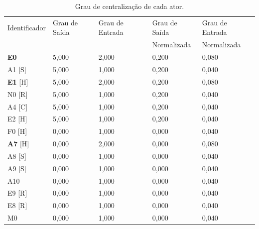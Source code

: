 \begin{table}[htbp]
\centering
\caption{Grau de centralização de cada ator.}
\label{table-centralize-degree}
\begin{tabular}{|l|l|l|l|l|}
\hline
Identificador & Grau de Saída & Grau de Entrada & Grau de Saída  & Grau de Entrada \\ 
	      &               &                 & Normalizada    & Normalizada \\ \hline
\textbf{E0}           & 5,000         & 2,000           & 0,200                     & 0,080                       \\ \hline
A1 {[}S{]}    & 5,000         & 1,000           & 0,200                     & 0,040                       \\ \hline
\textbf{E1} {[}H{]}    & 5,000         & 2,000           & 0,200                     & 0,080                       \\ \hline
N0 {[}R{]}    & 5,000         & 1,000           & 0,200                     & 0,040                       \\ \hline
A4 {[}C{]}    & 5,000         & 1,000           & 0,200                     & 0,040                       \\ \hline
E2 {[}H{]}    & 5,000         & 1,000           & 0,200                     & 0,040                       \\ \hline
F0 {[}H{]}    & 0,000         & 1,000           & 0,000                     & 0,040                       \\ \hline
\textbf{A7} {[}H{]}    & 0,000         & 2,000           & 0,000                     & 0,080                       \\ \hline
A8 {[}S{]}    & 0,000         & 1,000           & 0,000                     & 0,040                       \\ \hline
A9 {[}S{]}    & 0,000         & 1,000           & 0,000                     & 0,040                       \\ \hline
A10           & 0,000         & 1,000           & 0,000                     & 0,040                       \\ \hline
E9 {[}R{]}    & 0,000         & 1,000           & 0,000                     & 0,040                       \\ \hline
E8 {[}R{]}    & 0,000         & 1,000           & 0,000                     & 0,040                       \\ \hline
M0            & 0,000         & 1,000           & 0,000                     & 0,040                       \\ \hline

\end{tabular}
\end{table}

